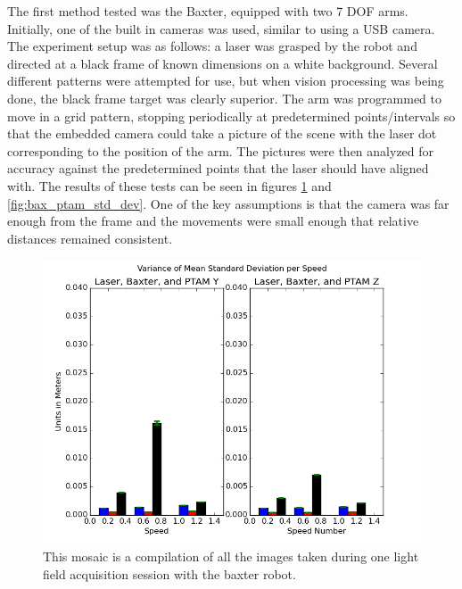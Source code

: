 \documentclass[12pt]{report}
\begin{document}
The first method tested was the Baxter, equipped with two 7 DOF arms. Initially, one of the built in cameras was used, similar to using a USB camera. The experiment setup was as follows: a laser was grasped by the robot and directed at a black frame of known dimensions on a white background. Several different patterns were attempted for use, but when vision processing was being done, the black frame target was clearly superior. The arm was programmed to move in a grid pattern, stopping periodically at predetermined points/intervals so that the embedded camera could take a picture of the scene with the laser dot corresponding to the position of the arm. The pictures were then analyzed for accuracy against the predetermined points that the laser should have aligned with. The results of these tests can be seen in figures \ref{fig:bax_ptam_variance} and \ref{fig:bax_ptam_std_dev}. One of the key assumptions is that the camera was far enough from the frame and the movements were small enough that relative distances remained consistent.
\begin{figure}[!ht]
	\centering
	\includegraphics[scale=0.55]{bax_and_ptam_var.png}
	\caption{This mosaic is a compilation of all the images taken during one light field acquisition session with the baxter robot.}
	\label{fig:bax_ptam_variance}
\end{figure}
\end{document}
